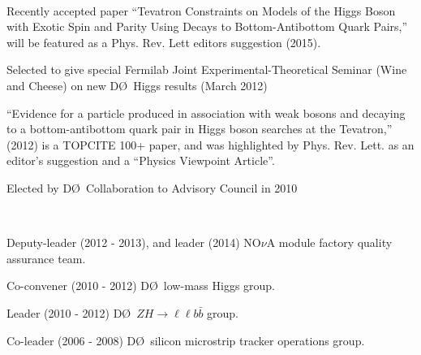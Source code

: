 \documentclass[amsmath,amssymb]{revtex4}
\def\dzero{D\O}
\begin{document}
\\
\begin{list}{}
            {\setlength{\itemsep}{0.0in}\setlength{\parsep}{0.0in}
             \addtolength{\parskip}{-0.5in}}
\item Recently accepted paper ``Tevatron Constraints  on Models of the Higgs Boson with Exotic Spin and Parity
      Using Decays  to Bottom-Antibottom Quark Pairs,'' will be featured as a  Phys. Rev. Lett editors suggestion (2015).
\item Selected to give special Fermilab Joint Experimental-Theoretical Seminar (Wine and Cheese)
      on new \dzero~Higgs results (March 2012)
\item  ``Evidence for a particle produced in association with weak bosons and decaying to a
        bottom-antibottom quark pair in Higgs boson searches at the Tevatron,'' (2012) is a TOPCITE 100+ paper, and
        was highlighted by Phys. Rev. Lett. as an editor's suggestion and a ``Physics Viewpoint Article''.
\item Elected by \dzero~Collaboration to Advisory Council in 2010
\end{list}
\vspace{\baselineskip}

\\
\begin{list}{}
            {\setlength{\itemsep}{0.0in}\setlength{\parsep}{0.0in}
             \addtolength{\parskip}{-0.5in}}
\item Deputy-leader (2012 - 2013), and leader (2014) NO$\nu$A module factory quality assurance team.
\item Co-convener (2010 - 2012) \dzero~low-mass Higgs group.
\item Leader (2010 - 2012) \dzero~$ZH\to\ell\ell b\bar{b}$ group.
\item Co-leader (2006 - 2008) \dzero~silicon microstrip tracker operations group.
\end{list}
\vspace{\baselineskip}
\end{document}
